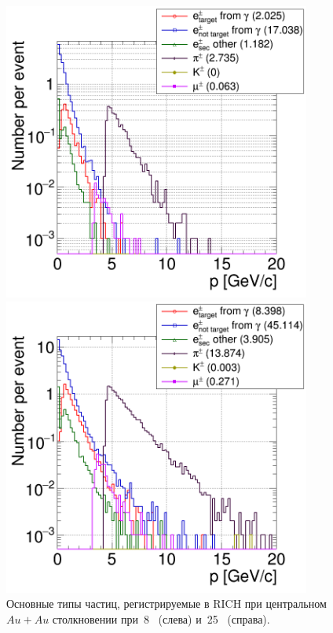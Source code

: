\begin{figure}[H]
\begin{minipage}[t]{0.495\textwidth}
\includegraphics[width=0.9\textwidth]{pictures/RICH_8AGeV.png}
\end{minipage}
\begin{minipage}[t]{0.495\textwidth}
\includegraphics[width=0.9\textwidth]{pictures/RICH_25AGeV.png}
\end{minipage}
\caption{Основные типы частиц, регистрируемые в RICH при центральном $Au+Au$ столкновении при~8~\GeVperNucl{} (слева) и~25~\GeVperNucl{} (справа).}
\label{fig:RICH8and25AGeV}
\end{figure}
